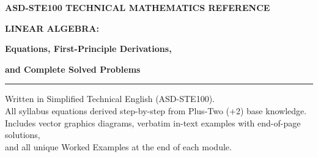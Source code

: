 \documentclass[11pt,a4paper,openany,oneside]{book}
\numberwithin{equation}{chapter}
\begin{document}
\begin{titlepage}
\centering
\vspace*{15mm}
{\selectfont\bfseries\large\color{teal} ASD-STE100 TECHNICAL MATHEMATICS REFERENCE\par}
\vspace{6mm}
{\selectfont\bfseries\Huge\color{ink} LINEAR ALGEBRA:\par}
\vspace{3mm}
{\selectfont\bfseries\LARGE\color{teal} Equations, First-Principle Derivations,\par}
{\selectfont\bfseries\LARGE\color{teal} and Complete Solved Problems\par}
\vspace{8mm}
{\color{teal}\rule{\linewidth}{1.5pt}\par}
\vspace{6mm}
{\large\color{slate} Written in Simplified Technical English (ASD-STE100).\\
All syllabus equations derived step-by-step from Plus-Two (+2) base knowledge.\\
Includes vector graphics diagrams, verbatim in-text examples with end-of-page solutions,\\
and all unique Worked Examples at the end of each module.\par}
\vspace{10mm}


\end{titlepage}
\end{document}
